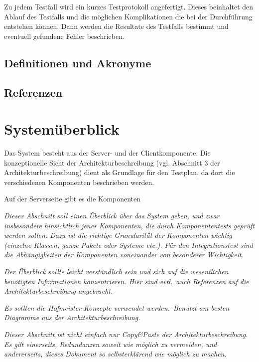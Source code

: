 \documentclass[fontsize=12pt,paper=a4,twoside]{scrartcl}
\begin{document}
Zu jedem Testfall wird ein kurzes Testprotokoll angefertigt. Dieses beinhaltet den Ablauf des Testfalls und die möglichen Komplikationen die bei der Durchführung entstehen können. Dann werden die Resultate des Testfalls bestimmt und eventuell gefundene Fehler beschrieben.

\subsection{Definitionen und Akronyme}
\label{c00b}


\subsection{Referenzen}





\section{Systemüberblick}\label{c02}
Das System besteht aus der Server- und der Clientkomponente. Die konzeptionelle Sicht der Architekturbeschreibung (vgl. Abschnitt 3 der Architekturbeschreibung) dient als Grundlage für den Testplan, da dort die verschiedenen Komponenten  beschrieben werden.

Auf der Serverseite gibt es die Komponenten 

{\em Dieser Abschnitt soll einen Überblick über das System geben, und
  zwar insbesondere hinsichtlich jener Komponenten, die durch
  Komponententests geprüft werden sollen. Dazu ist die richtige
  Granularität der Komponenten wichtig (einzelne Klassen, ganze Pakete
  oder Systeme etc.). Für den Integrationstest sind die Abhängigkeiten
  der Komponenten voneinander von besonderer Wichtigkeit.}

{\em Der Überblick sollte leicht verständlich sein und sich auf die
  wesentlichen benötigten Informationen konzentrieren. Hier sind
  evtl.\ auch Referenzen auf die Architekturbeschreibung angebracht.}

{\em Es sollten die Hofmeister-Konzepte verwendet
  werden.\ Benutzt am besten Diagramme aus der Architekturbeschreibung.}

\emph{Dieser Abschnitt ist nicht einfach nur Copy\&Paste der
  Architekturbeschreibung. Es gilt einerseits, Redundanzen soweit wie
  möglich zu vermeiden, und andererseits, dieses Dokument so
  selbsterklärend wie möglich zu machen.}
\end{document}
